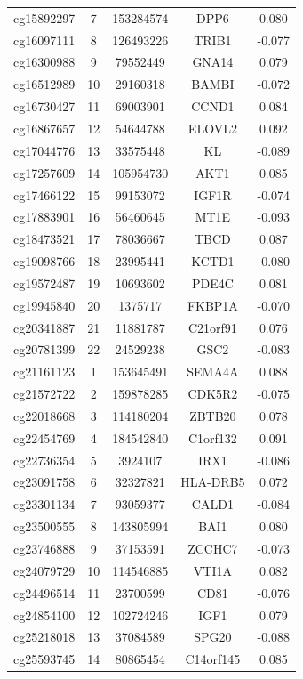 \documentclass[12pt,a4paper]{article}
\begin{document}
\begin{longtable}{|c|c|c|c|c|}
		cg15892297 & 7 & 153284574 & DPP6 & 0.080 \\
		cg16097111 & 8 & 126493226 & TRIB1 & -0.077 \\
		cg16300988 & 9 & 79552449 & GNA14 & 0.079 \\
		cg16512989 & 10 & 29160318 & BAMBI & -0.072 \\
		cg16730427 & 11 & 69003901 & CCND1 & 0.084 \\
		cg16867657 & 12 & 54644788 & ELOVL2 & 0.092 \\
		cg17044776 & 13 & 33575448 & KL & -0.089 \\
		cg17257609 & 14 & 105954730 & AKT1 & 0.085 \\
		cg17466122 & 15 & 99153072 & IGF1R & -0.074 \\
		cg17883901 & 16 & 56460645 & MT1E & -0.093 \\
		cg18473521 & 17 & 78036667 & TBCD & 0.087 \\
		cg19098766 & 18 & 23995441 & KCTD1 & -0.080 \\
		cg19572487 & 19 & 10693602 & PDE4C & 0.081 \\
		cg19945840 & 20 & 1375717 & FKBP1A & -0.070 \\
		cg20341887 & 21 & 11881787 & C21orf91 & 0.076 \\
		cg20781399 & 22 & 24529238 & GSC2 & -0.083 \\
		cg21161123 & 1 & 153645491 & SEMA4A & 0.088 \\
		cg21572722 & 2 & 159878285 & CDK5R2 & -0.075 \\
		cg22018668 & 3 & 114180204 & ZBTB20 & 0.078 \\
		cg22454769 & 4 & 184542840 & C1orf132 & 0.091 \\
		cg22736354 & 5 & 3924107 & IRX1 & -0.086 \\
		cg23091758 & 6 & 32327821 & HLA-DRB5 & 0.072 \\
		cg23301134 & 7 & 93059377 & CALD1 & -0.084 \\
		cg23500555 & 8 & 143805994 & BAI1 & 0.080 \\
		cg23746888 & 9 & 37153591 & ZCCHC7 & -0.073 \\
		cg24079729 & 10 & 114546885 & VTI1A & 0.082 \\
		cg24496514 & 11 & 23700599 & CD81 & -0.076 \\
		cg24854100 & 12 & 102724246 & IGF1 & 0.079 \\
		cg25218018 & 13 & 37084589 & SPG20 & -0.088 \\
		cg25593745 & 14 & 80865454 & C14orf145 & 0.085 \\

\end{longtable}
\end{document}
